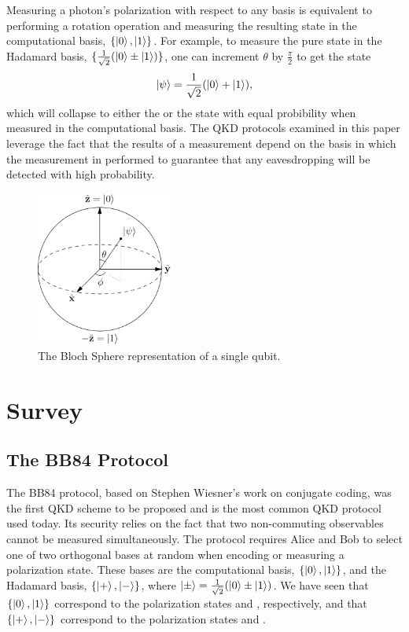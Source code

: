 \documentclass[conference]{IEEEtran}
\begin{document}
Measuring a photon's polarization with respect to any basis is equivalent to performing a rotation operation and measuring the resulting state in the computational basis, $\{\left\vert{0}\right\rangle, \left\vert{1}\right\rangle\}$. For example, to measure the pure state  in the Hadamard basis, $\{\frac{1}{\sqrt{2}}(\left\vert{0}\right\rangle\pm\left\vert{1}\right\rangle)\}$, one can increment $\theta$ by $\frac{\pi}{2}$ to get the state \[ \left\vert{\psi}\right\rangle = \frac{1}{\sqrt{2}}(\left\vert{0}\right\rangle + \left\vert{1}\right\rangle), \] which will collapse to either the  or the  state with equal probibility when measured in the computational basis. The QKD protocols examined in this paper leverage the fact that the results of a measurement depend on the basis in which the measurement in performed to guarantee that any eavesdropping will be detected with high probability.\\
\begin{figure}[h]
  \hspace*{1.2cm}\includegraphics[width=0.4\textwidth]{bloch-sphere.png}
  \caption{The Bloch Sphere representation of a single qubit\cite{Wikipedia}.}
  \label{fig:blochSphere}
  \end{figure}

\section{Survey}
\subsection{The BB84 Protocol}
The BB84 protocol, based on Stephen Wiesner's work on conjugate coding\cite{Wiesner}, was the first QKD scheme to be proposed and is the most common QKD protocol used today. Its security relies on the fact that two non-commuting observables cannot be measured simultaneously. The protocol requires Alice and Bob to select one of two orthogonal bases at random when encoding or measuring a polarization state. These bases are the computational basis, $\{\left\vert{0}\right\rangle, \left\vert{1}\right\rangle\}$, and the Hadamard basis, $\{\left\vert{+}\right\rangle, \left\vert{-}\right\rangle\}$, where $\left\vert{\pm}\right\rangle = \frac{1}{\sqrt{2}}(\left\vert{0}\right\rangle\pm\left\vert{1}\right\rangle)$. We have seen that $\{\left\vert{0}\right\rangle, \left\vert{1}\right\rangle\}$ correspond to the polarization states \ket{\uparrow} and \ket{\rightarrow}, respectively, and that $\{\left\vert{+}\right\rangle, \left\vert{-}\right\rangle\}$ correspond to the polarization states \ket{\nwarrow} and \ket{\nearrow}.\\
\end{document}
